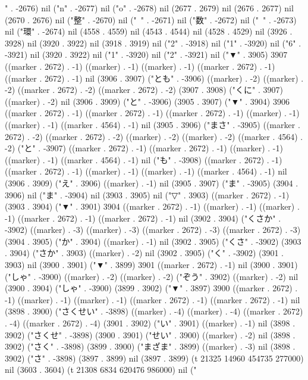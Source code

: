 " . -2676) nil ("n" . -2677) nil ("o" . -2678) nil (2677 . 2679) nil (2676 . 2677) nil (2670 . 2676) nil ("整" . -2670) nil ("~" . -2671) nil ("数" . -2672) nil ("~" . -2673) nil ("環" . -2674) nil (4558 . 4559) nil (4543 . 4544) nil (4528 . 4529) nil (3926 . 3928) nil (3920 . 3922) nil (3918 . 3919) nil ("2" . -3918) nil ("1" . -3920) nil ("6" . -3921) nil (3920 . 3922) nil ("1" . -3920) nil ("2" . -3921) nil ("▼" . 3905) 3907 ((marker . 2672) . -1) ((marker) . -1) ((marker) . -1) ((marker . 2672) . -1) ((marker . 2672) . -1) nil (3906 . 3907) ("とも" . -3906) ((marker) . -2) ((marker) . -2) ((marker . 2672) . -2) ((marker . 2672) . -2) (3907 . 3908) ("くに" . 3907) ((marker) . -2) nil (3906 . 3909) ("と" . -3906) (3905 . 3907) ("▼" . 3904) 3906 ((marker . 2672) . -1) ((marker . 2672) . -1) ((marker . 2672) . -1) ((marker) . -1) ((marker) . -1) ((marker . 4564) . -1) nil (3905 . 3906) ("まさ" . -3905) ((marker . 2672) . -2) ((marker . 2672) . -2) ((marker) . -2) ((marker) . -2) ((marker . 4564) . -2) ("と" . -3907) ((marker . 2672) . -1) ((marker . 2672) . -1) ((marker) . -1) ((marker) . -1) ((marker . 4564) . -1) nil ("も" . -3908) ((marker . 2672) . -1) ((marker . 2672) . -1) ((marker) . -1) ((marker) . -1) ((marker . 4564) . -1) nil (3906 . 3909) ("え" . 3906) ((marker) . -1) nil (3905 . 3907) ("ま" . -3905) (3904 . 3906) nil ("ま" . -3904) nil (3903 . 3905) nil ("▽" . 3903) ((marker . 2672) . -1) (3903 . 3904) ("▼" . 3901) 3904 ((marker . 2672) . -1) ((marker) . -1) ((marker) . -1) ((marker . 2672) . -1) ((marker . 2672) . -1) nil (3902 . 3904) ("くさか" . -3902) ((marker) . -3) ((marker) . -3) ((marker . 2672) . -3) ((marker . 2672) . -3) (3904 . 3905) ("か" . 3904) ((marker) . -1) nil (3902 . 3905) ("くさ" . -3902) (3903 . 3904) ("さか" . 3903) ((marker) . -2) nil (3902 . 3905) ("く" . -3902) (3901 . 3903) nil (3900 . 3901) ("▼" . 3899) 3901 ((marker . 2672) . -1) nil (3900 . 3901) ("しゃ" . -3900) ((marker) . -2) ((marker) . -2) ("ぞう" . 3902) ((marker) . -2) nil (3900 . 3904) ("しゃ" . -3900) (3899 . 3902) ("▼" . 3897) 3900 ((marker . 2672) . -1) ((marker) . -1) ((marker) . -1) ((marker . 2672) . -1) ((marker . 2672) . -1) nil (3898 . 3900) ("さくせい" . -3898) ((marker) . -4) ((marker) . -4) ((marker . 2672) . -4) ((marker . 2672) . -4) (3901 . 3902) ("い" . 3901) ((marker) . -1) nil (3898 . 3902) ("さくせ" . -3898) (3900 . 3901) ("せい" . 3900) ((marker) . -2) nil (3898 . 3902) ("さく" . -3898) (3899 . 3900) ("まざま" . 3899) ((marker) . -3) nil (3898 . 3902) ("さ" . -3898) (3897 . 3899) nil (3897 . 3899) (t 21325 14960 454735 277000) nil (3603 . 3604) (t 21308 6834 620476 986000) nil ("          %
